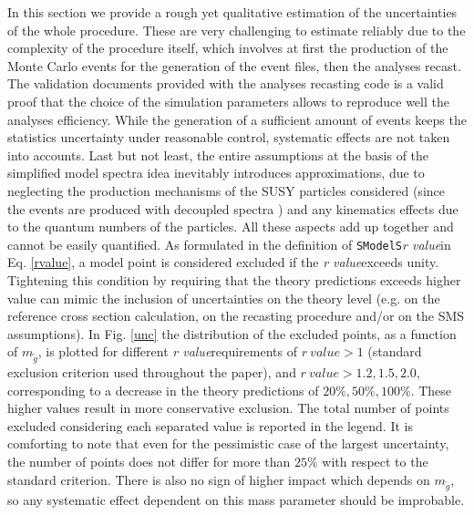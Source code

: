 \documentclass[preprint,number,sort&compress,twocolumn,3p]{elsstyarticle}
\newcommand{\SMO}{\texttt{SModelS\xspace}}
\newcommand{\MGLU}{$ m _{ \tilde g } $\xspace}
\newcommand{\RVALUE}{\textit{r value}}
\begin{document}
In this section we provide a rough yet qualitative estimation of the uncertainties of the whole procedure. These are very challenging to estimate reliably due to the complexity of the procedure itself, which involves at first the production of the Monte Carlo events for the generation of the event files, then the analyses recast. The validation documents provided with the analyses recasting code is a valid proof that the choice of the simulation parameters allows to reproduce well the analyses efficiency. While the generation of a sufficient amount of events keeps the statistics uncertainty under reasonable control, systematic effects are not taken into accounts. Last but not least, the entire assumptions at the basis of the simplified model spectra idea inevitably introduces approximations, due to neglecting the production mechanisms of the SUSY particles considered (since the events are produced with decoupled spectra ) and any kinematics effects due to the quantum numbers of the particles. All these aspects add up together and cannot be easily quantified. As formulated in the definition of \SMO \RVALUE in Eq. \ref{rvalue}, a model point is considered excluded if the \RVALUE exceeds unity. Tightening this condition by requiring that the theory predictions exceeds higher value can mimic the inclusion of uncertainties on the theory level (e.g. on the reference cross section calculation, on the recasting procedure and/or on the SMS assumptions). 
In Fig. \ref{unc} the distribution of the excluded points, as a function of \MGLU, is plotted for different \RVALUE requirements of $r\ value >1$ (standard exclusion criterion used throughout the paper), and $r\ value >1.2 , 1.5,2.0$, corresponding to a decrease in the theory predictions of $20\%,50\%,100\%$. These higher values result in more conservative exclusion. The total number of points excluded considering each separated value is reported in the legend. It is comforting to note that even for the pessimistic case of the largest uncertainty, the number of points does not differ for more than $25\%$ with respect to the standard criterion. There is also no sign of higher impact which depends on \MGLU, so any systematic effect dependent on this mass parameter should be improbable. 
\end{document}
